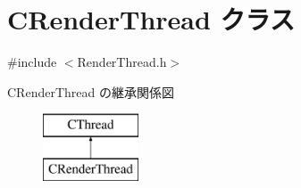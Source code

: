 \hypertarget{class_c_render_thread}{}\section{C\+Render\+Thread クラス}
\label{class_c_render_thread}


{\ttfamily \#include $<$Render\+Thread.\+h$>$}

C\+Render\+Thread の継承関係図\begin{figure}[H]
\begin{center}
\leavevmode
\includegraphics[height=2.000000cm]{class_c_render_thread}
\end{center}
\end{figure}
